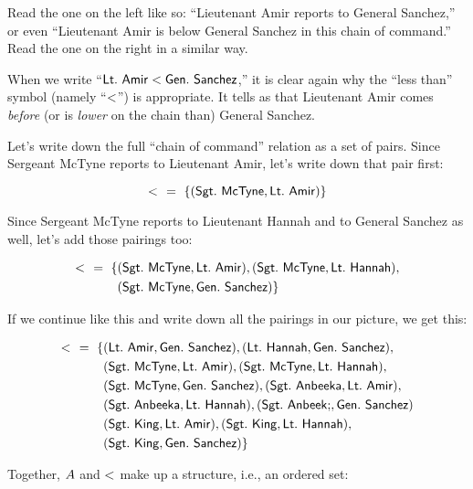 \documentclass[../../../main.tex]{subfiles}
\begin{document}
Read the one on the left like so: ``Lieutenant Amir reports to General Sanchez,'' or even ``Lieutenant Amir is below General Sanchez in this chain of command.'' Read the one on the right in a similar way.

\begin{aside}
  \begin{remark}
    When we write ``$\e{Lt.~Amir} \strictorder/ \e{Gen.~Sanchez}$,'' it is clear again why the ``less than'' symbol (namely ``$\strictorder/$'') is appropriate. It tells as that Lieutenant Amir comes \emph{before} (or is \emph{lower} on the chain than) General Sanchez.
  \end{remark}
\end{aside}

Let's write down the full ``chain of command'' relation as a set of pairs. Since Sergeant McTyne reports to Lieutenant Amir, let's write down that pair first:

\begin{equation*}
  \strictorder/~~=~\{ (\e{Sgt.~McTyne}, \e{Lt.~Amir}) \}
\end{equation*}

Since Sergeant McTyne reports to Lieutenant Hannah and to General Sanchez as well, let's add those pairings too:

\begin{align*}
  \strictorder/~~=~\{ &(\e{Sgt.~McTyne}, \e{Lt.~Amir}), (\e{Sgt.~McTyne}, \e{Lt.~Hannah}), \\
     &(\e{Sgt.~McTyne}, \e{Gen.~Sanchez}) \}
\end{align*}

If we continue like this and write down all the pairings in our picture, we get this:

\begin{align*}
  \strictorder/~~=~\{ &(\e{Lt.~Amir}, \e{Gen.~Sanchez}), (\e{Lt.~Hannah}, \e{Gen.~Sanchez}), \\
     &(\e{Sgt.~McTyne}, \e{Lt.~Amir}), (\e{Sgt.~McTyne}, \e{Lt.~Hannah}), \\
     &(\e{Sgt.~McTyne}, \e{Gen.~Sanchez}), (\e{Sgt.~Anbeeka}, \e{Lt.~Amir}), \\
     &(\e{Sgt.~Anbeeka}, \e{Lt.~Hannah}), (\e{Sgt.~Anbeek;}, \e{Gen.~Sanchez}) \\
     &(\e{Sgt.~King}, \e{Lt.~Amir}), (\e{Sgt.~King}, \e{Lt.~Hannah}), \\
     &(\e{Sgt.~King}, \e{Gen.~Sanchez}) \}
\end{align*}

Together, $A$ and $\strictorder/$ make up a structure, i.e., an ordered set:
\end{document}

